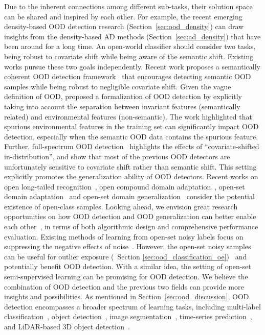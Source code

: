 \label{sec:future_direction}
Due to the inherent connections among different sub-tasks, their solution space can be shared and inspired by each other. For example, the recent emerging density-based OOD detection research (\cf Section~\ref{sec:ood_density}) can draw insights from the density-based AD methods (\cf Section~\ref{sec:ad_density}) that have been around for a long time.
An open-world classifier should consider two tasks,
\ie being robust to covariate shift while being aware of the semantic shift. Existing works pursue these two goals independently. Recent work proposes a semantically coherent OOD detection framework~ that encourages detecting semantic OOD samples while being robust to negligible covariate shift. 
Given the vague definition of OOD,  proposed a formalization of OOD detection by explicitly taking into account the separation
between invariant features (semantically related) and environmental features (non-semantic). The work highlighted that spurious environmental features in the training set can significantly impact
OOD detection, especially when the semantic OOD data contains the spurious feature. 
Further, full-spectrum OOD detection~ highlights the effects of ``covariate-shifted in-distribution'', and show that most of the previous OOD detectors are unfortunately sensitive to covariate shift rather than semantic shift. This setting explicitly promotes the generalization ability of OOD detectors.
Recent works on open long-tailed recognition~, open compound domain adaptation~, open-set domain adaptation~ and open-set domain generalization~ consider the potential existence of open-class samples.
Looking ahead, we envision great research opportunities on how OOD detection and OOD generalization can better enable each other~, in terms of both algorithmic design and comprehensive performance evaluation.
Existing methods of learning from open-set noisy labels focus on suppressing the negative effects of noise~. However,
the open-set noisy samples can be useful for outlier exposure (\cf ~Section \ref{sec:ood_classification_oe})~ and potentially benefit OOD detection.
With a similar idea, the setting of open-set semi-supervised learning can be promising for OOD detection.
We believe the combination of OOD detection and the previous two fields can provide more insights and possibilities.
As mentioned in Section~\ref{sec:ood_discussion}, OOD detection encompasses a broader spectrum of learning tasks, including multi-label classification~, object detection~, image segmentation~, time-series prediction~, and LiDAR-based 3D object detection~.
